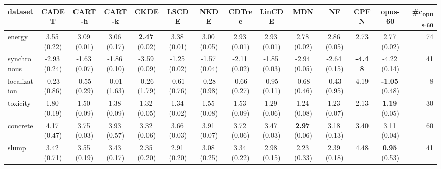 \begin{tabular}{@{}lccccccccccc>{\columncolor{agent}}cr@{}}
\toprule
dataset & CADET & CART-h & CART-k & CKDE & LSCDE & NKDE & CDTree & LinCDE & MDN & NF & CPFN & opus-60 & \#c\textsubscript{opus-60} \\
\midrule
energy & 3.55\,{\scriptsize(0.22)} & 3.09\,{\scriptsize(0.01)} & 3.06\,{\scriptsize(0.17)} & \textbf{2.47}\,{\scriptsize(0.02)} & 3.38\,{\scriptsize(0.01)} & 3.00\,{\scriptsize(0.05)} & 2.93\,{\scriptsize(0.01)} & 2.93\,{\scriptsize(0.01)} & 2.78\,{\scriptsize(0.02)} & 2.86\,{\scriptsize(0.05)} & 2.73 & 2.77\,{\scriptsize(0.02)} & 74 \\
synchronous & -2.93\,{\scriptsize(0.24)} & -1.63\,{\scriptsize(0.07)} & -1.86\,{\scriptsize(0.10)} & -3.59\,{\scriptsize(0.09)} & -1.25\,{\scriptsize(0.02)} & -1.57\,{\scriptsize(0.04)} & -2.11\,{\scriptsize(0.02)} & -1.85\,{\scriptsize(0.03)} & -2.94\,{\scriptsize(0.05)} & -2.64\,{\scriptsize(0.15)} & \textbf{-4.48} & -4.22\,{\scriptsize(0.14)} & 41 \\
localization & -0.23\,{\scriptsize(0.86)} & -0.55\,{\scriptsize(0.29)} & -0.01\,{\scriptsize(1.63)} & -0.26\,{\scriptsize(1.79)} & -0.61\,{\scriptsize(0.76)} & -0.28\,{\scriptsize(0.98)} & -0.66\,{\scriptsize(0.27)} & -0.95\,{\scriptsize(0.11)} & -0.68\,{\scriptsize(0.46)} & -0.43\,{\scriptsize(0.95)} & 4.19 & \textbf{-1.05}\,{\scriptsize(0.48)} & 8 \\
toxicity & 1.80\,{\scriptsize(0.19)} & 1.50\,{\scriptsize(0.09)} & 1.38\,{\scriptsize(0.09)} & 1.32\,{\scriptsize(0.05)} & 1.34\,{\scriptsize(0.02)} & 1.55\,{\scriptsize(0.08)} & 1.53\,{\scriptsize(0.09)} & 1.29\,{\scriptsize(0.06)} & 1.24\,{\scriptsize(0.08)} & 1.23\,{\scriptsize(0.07)} & 2.13 & \textbf{1.19}\,{\scriptsize(0.05)} & 30 \\
concrete & 4.17\,{\scriptsize(0.47)} & 3.75\,{\scriptsize(0.03)} & 3.93\,{\scriptsize(0.57)} & 3.32\,{\scriptsize(0.06)} & 3.66\,{\scriptsize(0.03)} & 3.91\,{\scriptsize(0.07)} & 3.72\,{\scriptsize(0.06)} & 3.47\,{\scriptsize(0.03)} & \textbf{2.97}\,{\scriptsize(0.06)} & 3.18\,{\scriptsize(0.13)} & 3.40 & 3.11\,{\scriptsize(0.04)} & 60 \\
slump & 3.42\,{\scriptsize(0.71)} & 3.55\,{\scriptsize(0.19)} & 3.43\,{\scriptsize(0.17)} & 2.35\,{\scriptsize(0.20)} & 2.91\,{\scriptsize(0.20)} & 3.08\,{\scriptsize(0.25)} & 3.34\,{\scriptsize(0.22)} & 2.98\,{\scriptsize(0.15)} & 2.23\,{\scriptsize(0.33)} & 2.39\,{\scriptsize(0.18)} & 4.48 & \textbf{0.95}\,{\scriptsize(0.53)} & 41 \\

\end{tabular}
